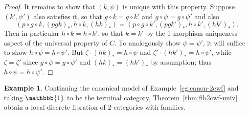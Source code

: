 \documentclass[10pt]{article}
\theoremstyle{definition}
\newtheorem{example}{Example}
\newcommand\one{\mathbbb{1}}
\newcommand\bb[1]{{(#1)}_*}
\begin{document}
\begin{proof}
  It remains to show that $(k,\psi)$ is unique with this property.
  Suppose $(k',\psi')$ also satisfies it, so that $g\circ k = g\circ k'$ and $g\circ \psi = g\circ \psi'$ and also
  \[ (p\circ g\circ k, \bb{pgk}, h\circ k, \bb{hk}) = (p\circ g\circ k', \bb{pgk'}, h\circ k', \bb{hk'}). \]
  Then in particular $h\circ k = h\circ k'$, so that $k=k'$ by the 1-morphism uniqueness aspect of the universal property of $C$.
  To analogously show $\psi=\psi'$, it will suffice to show $h\circ \psi = h\circ \psi'$.
  But $\zeta \cdot \bb{hk} = h\circ \psi$ and $\zeta' \cdot \bb{hk'} = h\circ \psi'$, while $\zeta=\zeta'$ since $g\circ \psi = g\circ \psi'$ and $\bb{hk} = \bb{hk'}$ by assumption; thus $h\circ \psi = h\circ \psi'$.
\end{proof}

\begin{example}
  Continuing the canonical model of Example~\ref{eg:canon-2cwf} and taking $\one$ to be the terminal category, Theorem~\ref{thm:fib2cwf-univ} obtain a local discrete fibration of 2-categories with families.

\end{example}



\end{document}
